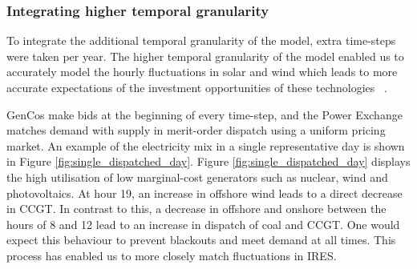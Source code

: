 %
%
%
%


\subsubsection{Integrating higher temporal granularity}

To integrate the additional temporal granularity of the model, extra time-steps were taken per year. The higher temporal granularity of the model enabled us to accurately model the hourly fluctuations in solar and wind which leads to more accurate expectations of the investment opportunities of these technologies ~\cite{Haydt2011,Ludig2011}.

GenCos make bids at the beginning of every time-step, and the Power Exchange matches demand with supply in merit-order dispatch using a uniform pricing market. An example of the electricity mix in a single representative day is shown in Figure \ref{fig:single_dispatched_day}. Figure \ref{fig:single_dispatched_day} displays the high utilisation of low marginal-cost generators such as nuclear, wind and photovoltaics. At hour 19, an increase in offshore wind leads to a direct decrease in CCGT. In contrast to this, a decrease in offshore and onshore between the hours of 8 and 12 lead to an increase in dispatch of coal and CCGT. One would expect this behaviour to prevent blackouts and meet demand at all times. This process has enabled us to more closely match fluctuations in IRES.

